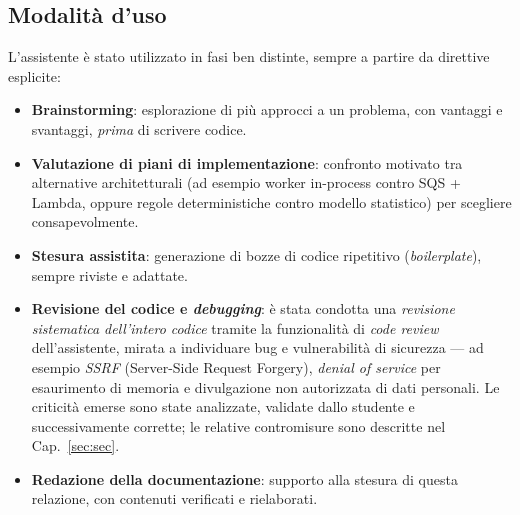 \documentclass[11pt,a4paper]{article}
\begin{document}
\subsection{Modalità d'uso}
L'assistente è stato utilizzato in fasi ben distinte, sempre a partire da direttive
esplicite:
\begin{itemize}[nosep]
  \item \textbf{Brainstorming}: esplorazione di più approcci a un problema, con
        vantaggi e svantaggi, \emph{prima} di scrivere codice.
  \item \textbf{Valutazione di piani di implementazione}: confronto motivato tra
        alternative architetturali (ad esempio worker in-process contro SQS + Lambda,
        oppure regole deterministiche contro modello statistico) per scegliere
        consapevolmente.
  \item \textbf{Stesura assistita}: generazione di bozze di codice ripetitivo
        (\emph{boilerplate}), sempre riviste e adattate.
  \item \textbf{Revisione del codice e \emph{debugging}}: è stata condotta una
        \emph{revisione sistematica dell'intero codice} tramite la funzionalità di
        \emph{code review} dell'assistente, mirata a individuare bug e vulnerabilità di
        sicurezza --- ad esempio \emph{SSRF} (Server-Side Request Forgery),
        \emph{denial of service} per esaurimento di memoria e divulgazione non
        autorizzata di dati personali. Le criticità emerse sono state analizzate,
        validate dallo studente e successivamente corrette; le relative contromisure
        sono descritte nel Cap.~\ref{sec:sec}.
  \item \textbf{Redazione della documentazione}: supporto alla stesura di questa
        relazione, con contenuti verificati e rielaborati.
\end{itemize}
\end{document}
